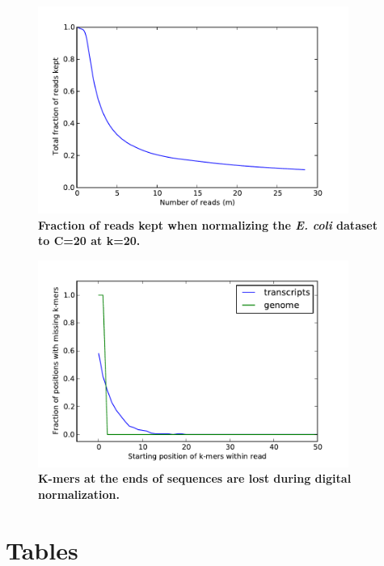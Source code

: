 \documentclass[10pt]{article}
\begin{document}
\begin{figure}
\centerline{\includegraphics[width=4in]{diginorm-accumulation.pdf}}
\caption{
{\bf Fraction of reads kept when normalizing the {\em E. coli} dataset to C=20 at k=20.}}
\label{fig:accumulate}
\end{figure}

\begin{figure}
\centerline{\includegraphics[width=4in]{diginorm-endbias.pdf}}
\caption{
{\bf K-mers at the ends of sequences are lost during digital normalization.}}
\label{fig:supplEnd}
\end{figure}

\section*{Tables}
\end{document}
